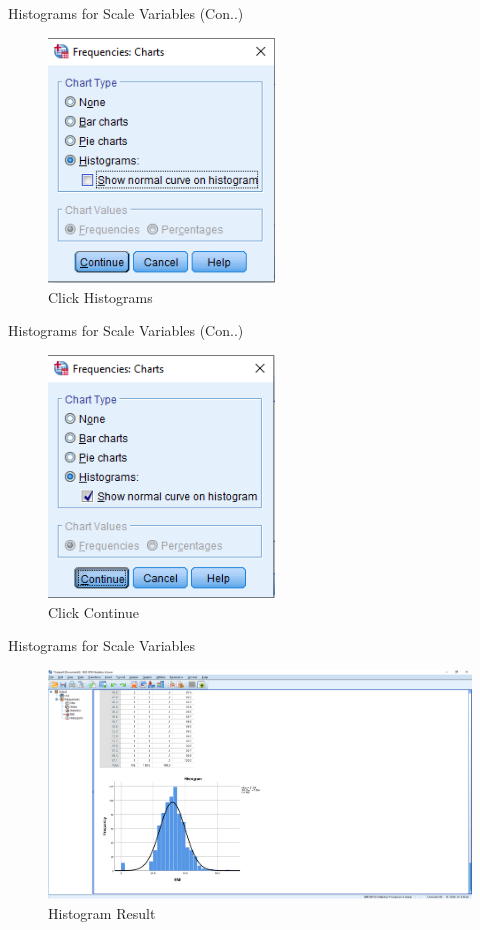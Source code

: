 \begin{frame}[t]{Histograms for Scale Variables (Con..)}
	\begin{figure}
		\centering
		\includegraphics[width=6cm]{img/1111117}
		\caption{Click Histograms}
	\end{figure}
\end{frame}
\begin{frame}[t]{Histograms for Scale Variables (Con..)}
	\begin{figure}
		\centering
		\includegraphics[width=6cm]{img/1111118}
		\caption{Click Continue}
	\end{figure}
\end{frame}
\begin{frame}[t]{Histograms for Scale Variables}
	\begin{figure}
		\centering
		\includegraphics[width=12cm]{img/1111119}
		\caption{Histogram Result}
	\end{figure}
\end{frame}
